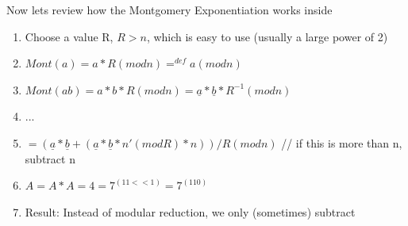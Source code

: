 Now lets review how the Montgomery Exponentiation works inside
\begin{enumerate}
	\item  Choose a value R, \(R>n\), which is easy to use (usually a large
	power of 2)
	\item  \(Mont(a)=a*R(mod n) =^{def}  a(mod n)\)
	\item  \(Mont(ab)=a*b*R(mod n)=\underline{a}*\underline{b}*R^{-1} (mod n)\)
	\item  \(... \)
	\item  \( = (\underline{a}*\underline{b} +
	(\underline{a}*\underline{b}*n'(mod R)*n))/R(modn) \) \newline
	// if this is more than n, subtract n
	\item  \( A = A*A = 4 = 7^{(11<<1)} = 7^{(110)} \)
	\item  Result: Instead of modular reduction, we only (sometimes) subtract
\end{enumerate}

